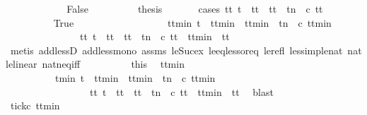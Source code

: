 \begin{isabellebody}
\ \ \ \ \isamarkupfalse%
\isanewline
\ \ \ \ \ \ \isamarkupfalse%
\ False\isanewline
\ \ \ \ \ \ \isamarkupfalse%
\ \isamarkupfalse%
\ {\isacharquery}thesis\isanewline
\ \ \ \ \ \ \isamarkupfalse%
{\isacharparenleft}cases\ {\isacartoucheopen}{\isasymexists}tt{\isachardot}\ t\ {\isacharless}\ tt\ {\isasymand}\ tt\ {\isasymle}\ t{\isacharplus}n\ {\isasymand}\ c\ tt{\isacartoucheclose}{\isacharparenright}\isanewline
\ \ \ \ \ \ \ \ \isamarkupfalse%
\ True\isanewline
\ \ \ \ \ \ \ \ \isanewline
\ \ \ \ \ \ \ \ \isamarkupfalse%
\ {\isacartoucheopen}{\isasymexists}ttmin{\isachardot}\ t\ {\isacharless}\ ttmin\ {\isasymand}\ ttmin\ {\isasymle}\ t{\isacharplus}n\ {\isasymand}\ c\ ttmin\isanewline
\ \ \ \ \ \ \ \ \ \ \ \ \ \ {\isasymand}\ {\isacharparenleft}{\isasymforall}tt{\isacharprime}{\isachardot}\ {\isacharparenleft}t\ {\isacharless}\ tt{\isacharprime}\ {\isasymand}\ tt{\isacharprime}\ {\isasymle}\ t{\isacharplus}n\ {\isasymand}\ c\ tt{\isacharprime}{\isacharparenright}\ {\isasymlongrightarrow}\ ttmin\ {\isasymle}\ tt{\isacharprime}{\isacharparenright}{\isacartoucheclose}\isanewline
\ \ \ \ \ \ \ \ \ \ \isamarkupfalse%
\ {\isacharparenleft}metis\ add{\isacharunderscore}lessD{}\ add{\isacharunderscore}less{\isacharunderscore}mono{}\ assms\ le{\isacharunderscore}Suc{\isacharunderscore}ex\ le{\isacharunderscore}eq{\isacharunderscore}less{\isacharunderscore}or{\isacharunderscore}eq\ le{\isacharunderscore}refl\ less{\isacharunderscore}imp{\isacharunderscore}le{\isacharunderscore}nat\ nat{\isacharunderscore}le{\isacharunderscore}linear\ nat{\isacharunderscore}neq{\isacharunderscore}iff{\isacharparenright}\isanewline
\ \ \ \ \ \ \ \ \isamarkupfalse%
\ this\ \isamarkupfalse%
\ ttmin\ \isanewline
\ \ \ \ \ \ \ \ \ \ tmin{\isacharcolon}\ {\isacartoucheopen}t\ {\isacharless}\ ttmin\ {\isasymand}\ ttmin\ {\isasymle}\ t{\isacharplus}n\ {\isasymand}\ c\ ttmin\isanewline
\ \ \ \ \ \ \ \ \ \ \ \ \ \ \ \ {\isasymand}\ {\isacharparenleft}{\isasymforall}tt{\isacharprime}{\isachardot}\ {\isacharparenleft}t\ {\isacharless}\ tt{\isacharprime}\ {\isasymand}\ tt{\isacharprime}\ {\isasymle}\ t{\isacharplus}n\ {\isasymand}\ c\ tt{\isacharprime}{\isacharparenright}\ {\isasymlongrightarrow}\ ttmin\ {\isasymle}\ tt{\isacharprime}{\isacharparenright}{\isacartoucheclose}\ \isamarkupfalse%
\ blast\isanewline
\ \ \ \ \ \ \ \ \isamarkupfalse%
\ tick{\isacharcolon}{\isacartoucheopen}c\ ttmin{\isacartoucheclose}\ \isamarkupfalse%

\end{isabellebody}
